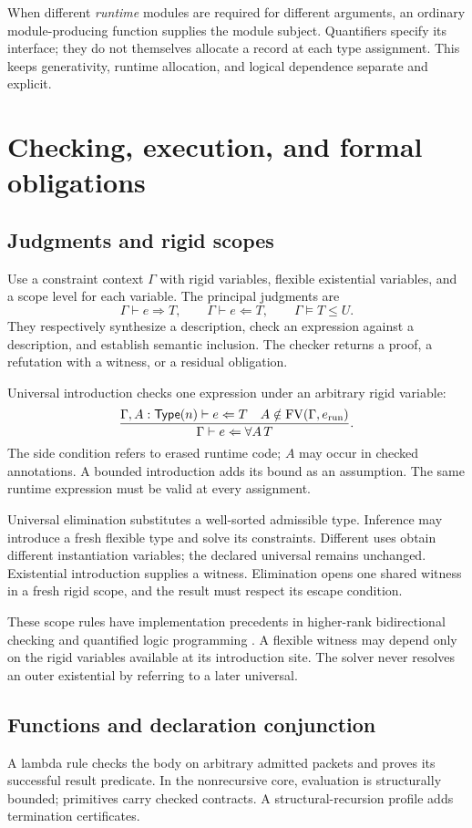 \documentclass[11pt,a4paper,oneside]{report}
\newcommand{\FV}{\operatorname{FV}}
\newcommand{\Type}{\mathsf{Type}}
\theoremstyle{remark}
\begin{document}
When different \emph{runtime} modules are required for different arguments, an
ordinary module-producing function supplies the module subject. Quantifiers
specify its interface; they do not themselves allocate a record at each type
assignment. This keeps generativity, runtime allocation, and logical dependence
separate and explicit.

\chapter{Checking, execution, and formal obligations}
\label{ch:checking}
\section{Judgments and rigid scopes}
Use a constraint context $\Gamma$ with rigid variables, flexible existential
variables, and a scope level for each variable. The principal judgments are
\[
 \Gamma\vdash e\Rightarrow T,
 \qquad \Gamma\vdash e\Leftarrow T,
 \qquad \Gamma\models T\le U.
\]
They respectively synthesize a description, check an expression against a
description, and establish semantic inclusion. The checker returns a proof,
a refutation with a witness, or a residual obligation.

Universal introduction checks one expression under an arbitrary rigid variable:
\[
 \frac{\Gamma,A:\Type(n)\vdash e\Leftarrow T
       \quad A\notin\FV(\Gamma,e_{\rm run})}
      {\Gamma\vdash e\Leftarrow\forall A\,T}.
\]
The side condition refers to erased runtime code; $A$ may occur in checked
annotations. A bounded introduction adds its bound as an assumption. The same
runtime expression must be valid at every assignment.

Universal elimination substitutes a well-sorted admissible type. Inference may
introduce a fresh flexible type and solve its constraints. Different uses obtain
different instantiation variables; the declared universal remains unchanged.
Existential introduction supplies a witness. Elimination opens one shared witness
in a fresh rigid scope, and the result must respect its escape condition.

These scope rules have implementation precedents in higher-rank bidirectional
checking and quantified logic programming \cite{dunfield,nadathur}. A flexible
witness may depend only on the rigid variables available at its introduction
site. The solver never resolves an outer existential by referring to a later
universal.

\section{Functions and declaration conjunction}
A lambda rule checks the body on arbitrary admitted packets and proves its
successful result predicate. In the nonrecursive core, evaluation is structurally
bounded; primitives carry checked contracts. A structural-recursion profile
adds termination certificates.
\end{document}
